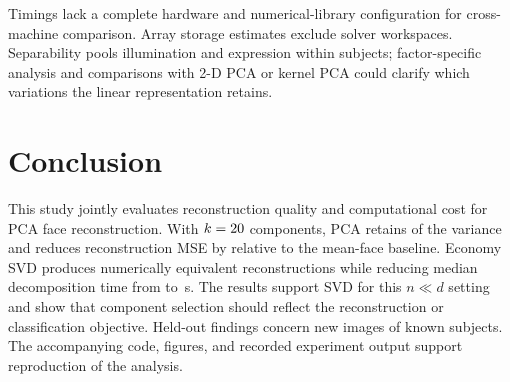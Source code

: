 \documentclass[journal]{IEEEtran}
\begin{document}
Timings lack a complete hardware and numerical-library configuration for
cross-machine comparison. Array storage estimates exclude solver
workspaces. Separability pools illumination and expression within subjects;
factor-specific analysis and comparisons with 2-D PCA or kernel PCA could
clarify which variations the linear representation retains.

\section{Conclusion}
This study jointly evaluates reconstruction quality and computational cost
for PCA face reconstruction. With $k=20$ components, PCA retains
\nVarKsSum{} of the variance and reduces reconstruction MSE by \nDrop{}
relative to the mean-face baseline. Economy SVD produces numerically
equivalent reconstructions while reducing median decomposition time from
\nEighMed{} to \nSvdMed{}\,s. The results support SVD for this $n\ll d$
setting and show that component selection should reflect the reconstruction
or classification objective. Held-out findings concern new images of known
subjects. The
accompanying code, figures, and recorded experiment output support
reproduction of the analysis.
\end{document}

